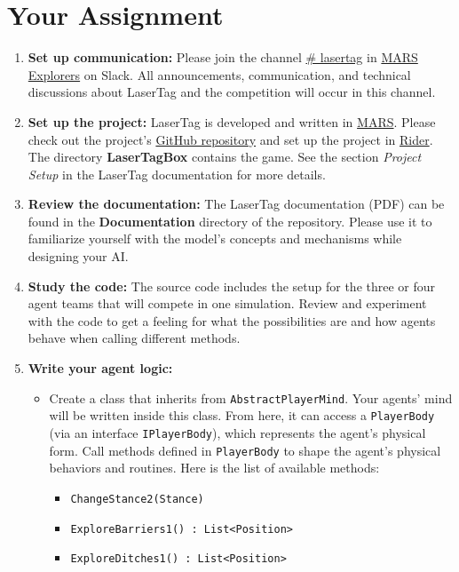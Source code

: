 \documentclass[
    a4paper,
    english,
    DIV=16,
    11pt,
    parskip=half,
]{scrartcl}
\begin{document}
\section*{Your Assignment}
\begin{enumerate}
  \item \textbf{Set up communication:} Please join the channel \underline{\# lasertag} in
  \href{https://join.slack.com/t/mars-explorers/shared_invite/zt-recgxwyo-WWOpjkLFq69CxQtSrlBIxw}{MARS Explorers} on Slack. All announcements, communication, and technical discussions about LaserTag and the competition will occur in this channel.
  \item \textbf{Set up the project:} LaserTag is developed and written in \href{https://mars-group-haw.github.io/index.html}{MARS}. Please check out the project's \href{https://github.com/MARS-Group-HAW/model-mars-laser-tag-game}{GitHub repository} and set up the project in \href{https://www.jetbrains.com/rider/}{Rider}. The directory \textbf{LaserTagBox} contains the game. See the section \emph{Project Setup} in the LaserTag documentation for more details.
  \item \textbf{Review the documentation:} The LaserTag documentation (PDF) can be found in the \textbf{Documentation} directory of the repository. Please use it to familiarize yourself with the model's concepts and mechanisms while designing your AI.
  \item \textbf{Study the code:} The source code includes the setup for the three or four agent teams that will compete in one simulation. Review and experiment with the code to get a feeling for what the possibilities are and how agents behave when calling different methods.
  \item \textbf{Write your agent logic:}
  \begin{itemize}
    \item Create a class that inherits from \texttt{AbstractPlayerMind}. Your agents' mind will be written inside this class. From here, it can access a \texttt{PlayerBody} (via an interface \texttt{IPlayerBody}), which represents the agent's physical form. Call methods defined in \texttt{PlayerBody} to shape the agent's physical behaviors and routines. Here is the list of available methods:
    \begin{itemize}
      \item \texttt{ChangeStance2(Stance)}
      \item \texttt{ExploreBarriers1() : List<Position>}
      \item \texttt{ExploreDitches1() : List<Position>}

\end{itemize}
\end{itemize}
\end{enumerate}
\end{document}
